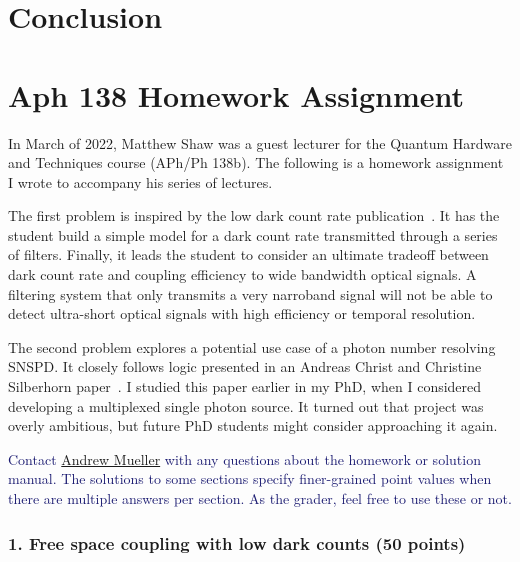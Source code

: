 \documentclass[11pt]{caltech_thesis} %
\begin{document}
\hypertarget{conclusion}{%
\chapter{Conclusion}\label{conclusion}}

\appendix

\hypertarget{aph-138-homework-assignment}{%
\chapter{Aph 138 Homework Assignment}\label{aph-138-homework-assignment}}

In March of 2022, Matthew Shaw was a guest lecturer for the Quantum Hardware and Techniques course (APh/Ph 138b). The following is a homework assignment I wrote to accompany his series of lectures.

The first problem is inspired by the low dark count rate publication~\autocite{Mueller:21}. It has the student build a simple model for a dark count rate transmitted through a series of filters. Finally, it leads the student to consider an ultimate tradeoff between dark count rate and coupling efficiency to wide bandwidth optical signals. A filtering system that only transmits a very narroband signal will not be able to detect ultra-short optical signals with high efficiency or temporal resolution.

The second problem explores a potential use case of a photon number resolving SNSPD. It closely follows logic presented in an Andreas Christ and Christine Silberhorn paper~\autocite{Andreas:12}. I studied this paper earlier in my PhD, when I considered developing a multiplexed single photon source. It turned out that project was overly ambitious, but future PhD students might consider approaching it again.

\textcolor{midnightblue}{Contact \href{mailto:andrewstermueller@gmail.com}{Andrew Mueller} with any questions about the homework or solution manual. The solutions to some sections specify finer-grained point values when there are multiple answers per section. As the grader, feel free to use these or not. }

\hypertarget{free-space-coupling-with-low-dark-counts-50-points}{%
\subsection{1. Free space coupling with low dark counts (50 points)}\label{free-space-coupling-with-low-dark-counts-50-points}}
\end{document}

